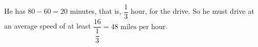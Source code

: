 He has $80-60=20$ minutes, that is, $\dfrac13$ hour, for the drive. So he must drive at an average speed of at least $\dfrac{16}{\dfrac13}=\boxed{48\text{ miles per hour}}$.
